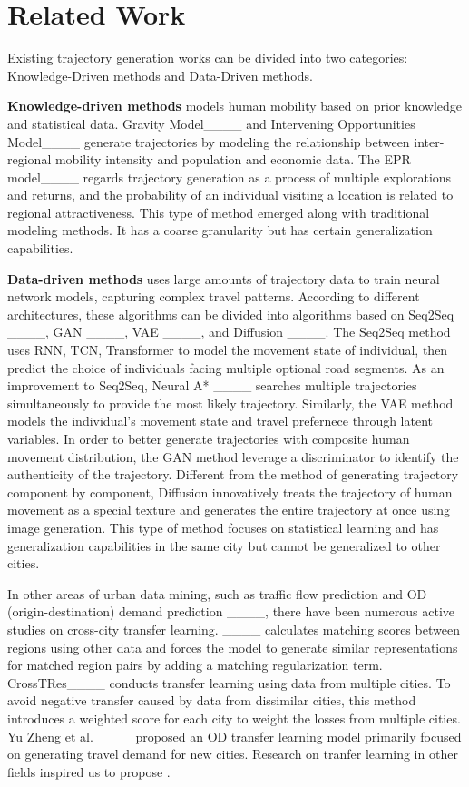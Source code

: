\section{Related Work}
Existing trajectory generation works can be divided into two categories: Knowledge-Driven methods and Data-Driven methods.

\textbf{Knowledge-driven methods} models human mobility based on prior knowledge and statistical data. Gravity Model____ and Intervening Opportunities Model____ generate trajectories by modeling the relationship between inter-regional mobility intensity and population and economic data. The EPR model____ regards trajectory generation as a process of multiple explorations and returns, and the probability of an individual visiting a location is related to regional attractiveness. This type of method emerged along with traditional modeling methods. It has a coarse granularity but has certain generalization capabilities.

\textbf{Data-driven methods} uses large amounts of trajectory data to train neural network models,  capturing complex travel patterns. According to different architectures, these algorithms can be divided into algorithms based on Seq2Seq ____, GAN ____, VAE ____, and Diffusion ____. The Seq2Seq method uses RNN, TCN, Transformer to model the movement state of individual, then predict the choice of individuals facing multiple optional road segments. As an improvement to Seq2Seq, Neural A* ____ searches multiple trajectories simultaneously to provide the most likely trajectory.  Similarly, the VAE method models the individual's movement state and travel prefernece through latent variables. In order to better generate trajectories with composite human movement distribution, the GAN method leverage a discriminator to identify the authenticity of the trajectory. Different from the method of generating trajectory component by component, Diffusion innovatively treats the trajectory of human movement as a special texture and generates the entire trajectory at once using image generation. This type of method focuses on statistical learning and has generalization capabilities in the same city but cannot be generalized to other cities.

In other areas of urban data mining, such as traffic flow prediction  and OD (origin-destination) demand prediction ____, there have been numerous active studies on cross-city transfer learning. ____ calculates matching scores between regions using other data and forces the model to generate similar representations for matched region pairs by adding a matching regularization term. 
CrossTRes____ conducts transfer learning using data from multiple cities. To avoid negative transfer caused by data from dissimilar cities, this method introduces a weighted score for each city to weight the losses from multiple cities. Yu Zheng et al.____ proposed an OD transfer learning model primarily focused on generating travel demand for new cities. Research on tranfer learning in other fields inspired us to propose \name.